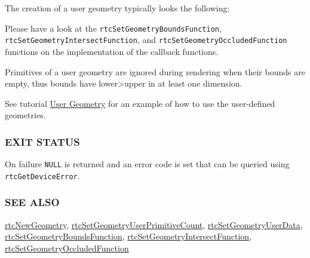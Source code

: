 The creation of a user geometry typically looks the following:

\begin{Shaded}
\begin{Highlighting}[]
\OperatorTok{=}\OperatorTok{(}\OperatorTok{,}\OperatorTok{);}
\OperatorTok{(}\OperatorTok{,}\OperatorTok{);}
\OperatorTok{(}\OperatorTok{,}\OperatorTok{);}
\OperatorTok{(}\OperatorTok{,}\OperatorTok{);}
\OperatorTok{(}\OperatorTok{,}\OperatorTok{);}
\OperatorTok{(}\OperatorTok{,}\OperatorTok{);}
\end{Highlighting}
\end{Shaded}

Please have a look at the \texttt{rtcSetGeometryBoundsFunction},
\texttt{rtcSetGeometryIntersectFunction}, and
\texttt{rtcSetGeometryOccludedFunction} functions on the implementation
of the callback functions.

Primitives of a user geometry are ignored during rendering when their
bounds are empty, thus bounds have lower\textgreater upper in at least
one dimension.

See tutorial \hyperref[user-geometry]{User Geometry} for an example of
how to use the user-defined geometries.

\subsubsection{EXIT STATUS}\label{exit-status}

On failure \texttt{NULL} is returned and an error code is set that can
be queried using \texttt{rtcGetDeviceError}.

\subsubsection{SEE ALSO}\label{see-also}

\hyperref[rtcnewgeometry]{rtcNewGeometry},
\hyperref[rtcsetgeometryuserprimitivecount]{rtcSetGeometryUserPrimitiveCount},
\hyperref[rtcsetgeometryuserdata]{rtcSetGeometryUserData},
\hyperref[rtcsetgeometryboundsfunction]{rtcSetGeometryBoundsFunction},
\hyperref[rtcsetgeometryintersectfunction]{rtcSetGeometryIntersectFunction},
\hyperref[rtcsetgeometryoccludedfunction]{rtcSetGeometryOccludedFunction}

